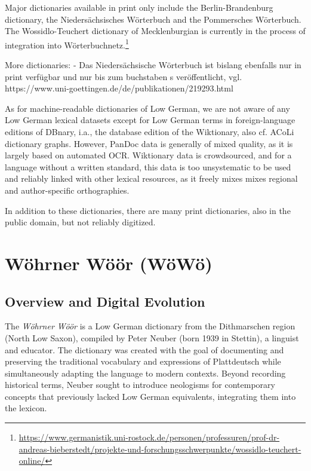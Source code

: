 \documentclass{article}
\begin{document}
Major dictionaries available in print only include the Berlin-Brandenburg dictionary, the Niedersächsisches Wörterbuch and the Pommersches Wörterbuch. The Wossidlo-Teuchert dictionary of Mecklenburgian is currently in the process of integration into Wörterbuchnetz.\footnote{\url{https://www.germanistik.uni-rostock.de/personen/professuren/prof-dr-andreas-bieberstedt/projekte-und-forschungsschwerpunkte/wossidlo-teuchert-online/}}

More dictionaries:
- Das Niedersächsische Wörterbuch ist bislang ebenfalls nur in print verfügbar und nur bis zum buchstaben s veröffentlicht, vgl. https://www.uni-goettingen.de/de/publikationen/219293.html



As for machine-readable dictionaries of Low German, we are not aware of any Low German lexical datasets except for Low German terms in foreign-language editions of DBnary, i.a., the database edition of the Wiktionary, also cf. ACoLi dictionary graphs. However, PanDoc data is generally of mixed quality, as it is largely based on automated OCR. Wiktionary data is crowdsourced, and for a language without a written standard, this data is too unsystematic to be used and reliably linked with other lexical resources, as it freely mixes mixes regional and author-specific orthographies.

In addition to these dictionaries, there are many print dictionaries, also in the public domain, but not reliably digitized.

\section{Wöhrner Wöör (WöWö)}

\subsection{Overview and Digital Evolution}

The \emph{Wöhrner Wöör} is a Low German dictionary from the Dithmarschen region (North Low Saxon), compiled by Peter Neuber (born 1939 in Stettin), a linguist and educator. The dictionary was created with the goal of documenting and preserving the traditional vocabulary and expressions of Plattdeutsch while simultaneously adapting the language to modern contexts. Beyond recording historical terms, Neuber sought to introduce neologisms for contemporary concepts that previously lacked Low German equivalents, integrating them into the lexicon.
\end{document}
